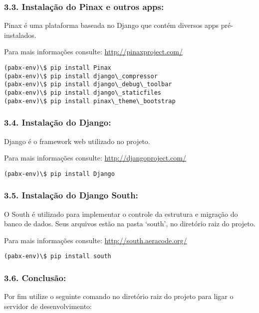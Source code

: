 \documentclass[letterpaper,10pt,brazil]{sphinxmanual}
\begin{document}
\subsubsection{3.3. Instalação do Pinax e outros apps:}
\label{inicio:instalacao-do-pinax-e-outros-apps}
Pinax é uma plataforma baseada no Django que contém diversos apps pré-instalados.

Para mais informações consulte: \href{http://pinaxproject.com/}{http://pinaxproject.com/}

\begin{Verbatim}[commandchars=\\\{\}]
(pabx-env)\$ pip install Pinax
(pabx-env)\$ pip install django\_compressor
(pabx-env)\$ pip install django\_debug\_toolbar
(pabx-env)\$ pip install django\_staticfiles
(pabx-env)\$ pip install pinax\_theme\_bootstrap
\end{Verbatim}


\subsubsection{3.4. Instalação do Django:}
\label{inicio:instalacao-do-django}
Django é o framework web utilizado no projeto.

Para mais informações consulte: \href{http://djangoproject.com/}{http://djangoproject.com/}

\begin{Verbatim}[commandchars=\\\{\}]
(pabx-env)\$ pip install Django
\end{Verbatim}


\subsubsection{3.5. Instalação do Django South:}
\label{inicio:instalacao-do-django-south}
O South é utilizado para implementar o controle da estrutura e migração do banco de dados. Seus arquivos estão na pasta `south', no diretório raiz do projeto.

Para mais informações consulte: \href{http://south.aeracode.org/}{http://south.aeracode.org/}

\begin{Verbatim}[commandchars=\\\{\}]
(pabx-env)\$ pip install south
\end{Verbatim}


\subsubsection{3.6. Conclusão:}
\label{inicio:conclusao}
Por fim utilize o seguinte comando no diretório raiz do projeto para ligar o servidor de desenvolvimento:
\end{document}
